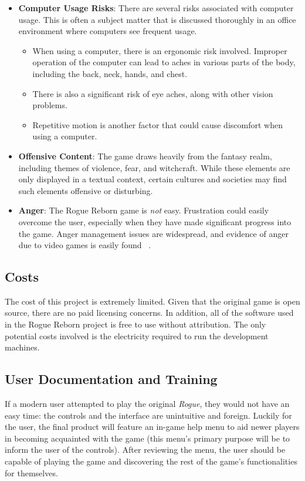\documentclass[12pt, titlepage]{article}
\begin{document}
	\begin{itemize}
		\item \textbf{Computer Usage Risks}: There are several risks associated with computer usage. This is often a subject matter that is discussed thoroughly in an office environment where computers see frequent usage.
		\begin{itemize}
			\item When using a computer, there is an ergonomic risk involved. Improper operation of the computer can lead to aches in various parts of the body, including the back, neck, hands, and chest.
			\item There is also a significant risk of eye aches, along with other vision problems.
			\item Repetitive motion is another factor that could cause discomfort when using a computer.
		\end{itemize}
		\item \textbf{Offensive Content}: The game draws heavily from the fantasy realm, including themes of violence, fear, and witchcraft.  While these elements are only displayed in a textual context, certain cultures and societies may find such elements offensive or disturbing.
		\item \textbf{Anger}: The Rogue Reborn game is \textit{not} easy. Frustration could easily overcome the user, especially when they have made significant progress into the game.  Anger management issues are widespread, and evidence of anger due to video games is easily found ~\citep{GameAnger}.
	\end{itemize}

	\subsection{Costs}

	The cost of this project is extremely limited.  Given that the original game is open source, there are no paid licensing concerns.  In addition, all of the software used in the Rogue Reborn project is free to use without attribution.  The only potential costs involved is the electricity required to run the development machines.

	\subsection{User Documentation and Training}

	If a modern user attempted to play the original \textit{Rogue}, they would not have an easy time: the controls and the interface are unintuitive and foreign.  Luckily for the user, the final product will feature an in-game help menu to aid newer players in becoming acquainted with the game (this menu's primary purpose will be to inform the user of the controls).  After reviewing the menu, the user should be capable of playing the game and discovering the rest of the game's functionalities for themselves.
\end{document}

